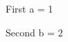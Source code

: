 \documentclass{article}
\begin{document}
\begin{exl}{First}
a = 1
\end{exl}
\begin{exl}[colback=white]{Second}
b = 2
\end{exl}
\end{document}
